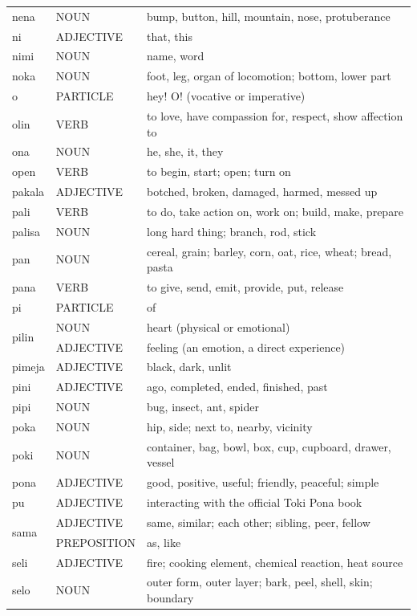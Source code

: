 \documentclass[14pt, a4paper]{extreport}
\begin{document}
\begin{longtable}{llp{10cm}}
  nena & NOUN & bump, button, hill, mountain, nose, protuberance \\
  ni & ADJECTIVE & that, this \\
  nimi & NOUN & name, word \\
  noka & NOUN & foot, leg, organ of locomotion; bottom, lower part \\
  o & PARTICLE & hey! O! (vocative or imperative) \\
  olin & VERB & to love, have compassion for, respect, show affection to \\
  ona & NOUN & he, she, it, they \\
  open & VERB & to begin, start; open; turn on \\
  pakala & ADJECTIVE & botched, broken, damaged, harmed, messed up \\
  pali & VERB & to do, take action on, work on; build, make, prepare \\
  palisa & NOUN & long hard thing; branch, rod, stick \\
  pan & NOUN & cereal, grain; barley, corn, oat, rice, wheat; bread, pasta \\
  pana & VERB & to give, send, emit, provide, put, release \\
  pi & PARTICLE & of \\
  \multirow[t]{2}{*}{pilin} & NOUN & heart (physical or emotional) \\
  & ADJECTIVE & feeling (an emotion, a direct experience) \\
  pimeja & ADJECTIVE & black, dark, unlit \\
  pini & ADJECTIVE & ago, completed, ended, finished, past \\
  pipi & NOUN & bug, insect, ant, spider \\
  poka & NOUN & hip, side; next to, nearby, vicinity \\
  poki & NOUN & container, bag, bowl, box, cup, cupboard, drawer, vessel \\
  pona & ADJECTIVE & good, positive, useful; friendly, peaceful; simple \\
  pu & ADJECTIVE & interacting with the official Toki Pona book \\
  \multirow[t]{2}{*}{sama} & ADJECTIVE & same, similar; each other; sibling, peer, fellow \\
  & PREPOSITION & as, like \\
  seli & ADJECTIVE & fire; cooking element, chemical reaction, heat source \\
  selo & NOUN & outer form, outer layer; bark, peel, shell, skin; boundary \\

\end{longtable}
\end{document}

